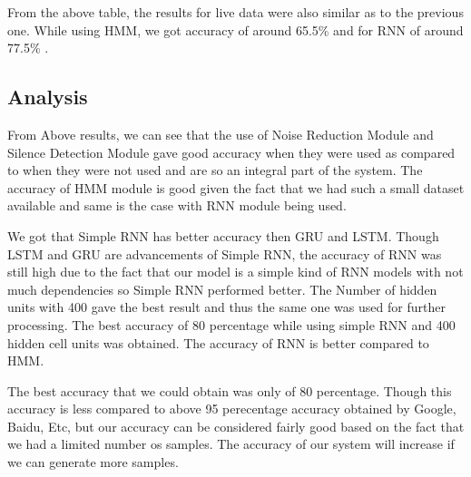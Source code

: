 From the above table, the results for live data were also similar as to the previous one. While using HMM, we got accuracy of around 65.5\% and for RNN of around 77.5\% . 



\subsection{Analysis}

From Above results, we can see that the use of Noise Reduction Module and Silence Detection Module gave good accuracy when they were used as compared to when they were not used and are so an integral part of the system. The accuracy of HMM module is good given the fact that we had such a small dataset available and same is the case with RNN module being used.

We got that Simple RNN has better accuracy then GRU and LSTM. Though LSTM and GRU are advancements of Simple RNN, the accuracy of RNN was still high due to the fact that our model is a simple kind of RNN models with not much dependencies so Simple RNN performed better. The Number of hidden units with 400 gave the best result and thus the same one was used for further processing. The best accuracy of 80 percentage while
using simple RNN and 400 hidden cell units was obtained. The accuracy of RNN is better compared to HMM.

The best accuracy that we could obtain was only of 80 percentage. Though this accuracy is less compared to above 95 perecentage accuracy obtained by Google, Baidu, Etc, but our accuracy can be considered fairly good based on the fact that we had a limited number os samples. The accuracy of our system will increase if we can generate more samples.